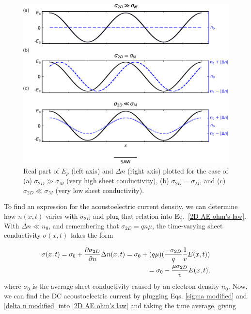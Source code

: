 \documentclass[double,12pt,1in,seploa]{beavtex}
\begin{document}
\begin{figure}
    \includegraphics{piezoelectric field and delta n edited.pdf}
    \caption{Real part of $E_p$ (left axis) and $\Delta n$ (right axis) plotted for the case of (a) $\sigma_{2D} \gg \sigma_M$ (very high sheet conductivity), (b) $\sigma_{2D} = \sigma_M$, and (c) $\sigma_{2D} \ll \sigma_M$ (very low sheet conductivity).}
    \label{piezoelectric field and delta n}
\end{figure}

To find an expression for the acoustoelectric current density, we can determine how $n(x,t)$ varies with $\sigma_{2D}$ and plug that relation into Eq.\ \ref{2D AE ohm's law}. With $\Delta n \ll n_0$, and remembering that $\sigma_{2D} = q n \mu$, the time-varying sheet conductivity $\sigma(x,t)$ takes the form

\begin{equation}
    \begin{split}
        \sigma(x,t) = \sigma_0 + \pdv{\sigma_{2D}}{n} \Delta n(x,t) = \sigma_0 + (q \mu)(\frac{-\sigma_{2D}}{q} \frac{1}{v}E(x,t)) \\
        = \sigma_0 - \frac{\mu \sigma_{2D}}{v}E(x,t),
    \end{split}
    \label{sigma modified}
\end{equation}
where $\sigma_0$ is the average sheet conductivity caused by an electron density $n_0$. Now, we can find the DC acoustoelectric current by plugging Eqs. \ref{sigma modified} and \ref{delta n modified} into \ref{2D AE ohm's law} and taking the time average, giving
\end{document}
